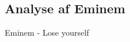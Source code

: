 \documentclass[12pt, letterpaper]{article}
\begin{document}
\begin{figure}[!h]
           \begin{floatrow}
       
           \end{floatrow}
\end{figure}

\newpage


\subsection{Analyse af Eminem}
Eminem - Lose yourself
\end{document}
